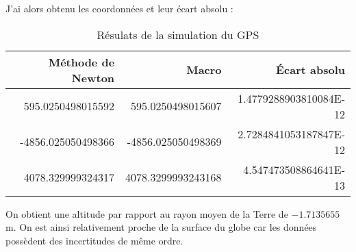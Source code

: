 		J'ai alors obtenu les coordonnées et leur écart absolu :
		\begin{table}[H]
			\centering
			\begin{tabular}{|r|r|r|}
				\hline
				Méthode de Newton	& Macro \code{fsolve}	& Écart absolu				\\	\hline
				595.0250498015592	& 595.0250498015607		& 1.4779288903810084E-12	\\	\hline
				-4856.025050498366	& -4856.025050498369	& 2.7284841053187847E-12	\\	\hline
				4078.329999324317	& 4078.3299993243168	& 4.547473508864641E-13		\\	\hline
			\end{tabular}
			\caption{Résulats de la simulation du GPS}
			\label{tb-1-resultGPS}
		\end{table}

		On obtient une altitude par rapport au rayon moyen de la Terre de $-1.7135655$ m. On est ainsi relativement proche de la surface du globe car les données possèdent des incertitudes de même ordre. 

